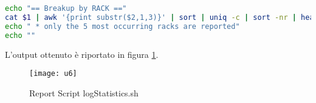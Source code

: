 \begin{lstlisting}[language=bash]
echo "== Breakup by RACK =="
cat $1 | awk '{print substr($2,1,3)}' | sort | uniq -c | sort -nr | head -n 5 | awk '{print $2, $1}'
echo " * only the 5 most occurring racks are reported"
echo ""
\end{lstlisting}

L'output ottenuto è riportato in figura \ref{u6}.\\

\begin{figure}[!htbp]
  \centering
  \texttt{[image: u6]}
  \caption{Report Script logStatistics.sh}
  \label{u6}
\end{figure}
